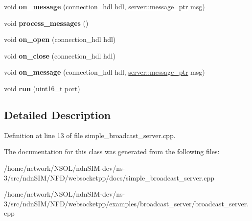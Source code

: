 \begin{DoxyCompactItemize}
\item 
void {\bfseries on\+\_\+message} (connection\+\_\+hdl hdl, \hyperlink{classwebsocketpp_1_1endpoint_a585ecbbfd9689d4e4229e4c8378bd672}{server\+::message\+\_\+ptr} msg)\hypertarget{classbroadcast__server_aa56cb8528f19afc3b1a2712d07d0b499}{}\label{classbroadcast__server_aa56cb8528f19afc3b1a2712d07d0b499}

\item 
void {\bfseries process\+\_\+messages} ()\hypertarget{classbroadcast__server_aab1bd3f376f3d5242660b686c6b45b40}{}\label{classbroadcast__server_aab1bd3f376f3d5242660b686c6b45b40}

\item 
void {\bfseries on\+\_\+open} (connection\+\_\+hdl hdl)\hypertarget{classbroadcast__server_a20d3e5b15b9e916f6772d3e1137327c0}{}\label{classbroadcast__server_a20d3e5b15b9e916f6772d3e1137327c0}

\item 
void {\bfseries on\+\_\+close} (connection\+\_\+hdl hdl)\hypertarget{classbroadcast__server_aba6fc18682e45978ae64ed1667deb44e}{}\label{classbroadcast__server_aba6fc18682e45978ae64ed1667deb44e}

\item 
void {\bfseries on\+\_\+message} (connection\+\_\+hdl hdl, \hyperlink{classwebsocketpp_1_1endpoint_a585ecbbfd9689d4e4229e4c8378bd672}{server\+::message\+\_\+ptr} msg)\hypertarget{classbroadcast__server_aa56cb8528f19afc3b1a2712d07d0b499}{}\label{classbroadcast__server_aa56cb8528f19afc3b1a2712d07d0b499}

\item 
void {\bfseries run} (uint16\+\_\+t port)\hypertarget{classbroadcast__server_af7c28eeb788bf2451364e76a02615cac}{}\label{classbroadcast__server_af7c28eeb788bf2451364e76a02615cac}

\end{DoxyCompactItemize}


\subsection{Detailed Description}


Definition at line 13 of file simple\+\_\+broadcast\+\_\+server.\+cpp.



The documentation for this class was generated from the following files\+:\begin{DoxyCompactItemize}
\item 
/home/network/\+N\+S\+O\+L/ndn\+S\+I\+M-\/dev/ns-\/3/src/ndn\+S\+I\+M/\+N\+F\+D/websocketpp/docs/simple\+\_\+broadcast\+\_\+server.\+cpp\item 
/home/network/\+N\+S\+O\+L/ndn\+S\+I\+M-\/dev/ns-\/3/src/ndn\+S\+I\+M/\+N\+F\+D/websocketpp/examples/broadcast\+\_\+server/broadcast\+\_\+server.\+cpp\end{DoxyCompactItemize}
